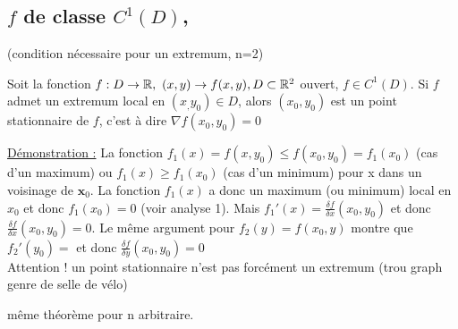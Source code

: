 \documentclass[12pt,a4paper]{article}
\begin{document}
\subsection{$f$ de classe $C^1(D)$,}
(condition nécessaire pour un extremum, n=2)\\
\begin{boite}
	 Soit la fonction $f: D\to \mathbb{R},\ (x,y) \to f(x,y), D\subset \mathbb{R}^2$ ouvert, $f \in C^1(D)$. Si $f$ admet un extremum local en $(x_,y_0) \in D$, alors $(x_0,y_0)$ est un point stationnaire de $f$, c'est à dire $\nabla f(x_0,y_0) = 0$
\end{boite}
\uline{Démonstration :} La fonction $f_1(x) = f(x,y_0) \leq f(x_0,y_0) = f_1(x_0)$ (cas d'un maximum) ou $f_1(x) \geq f_1(x_0)$ (cas d'un minimum) pour x dans un voisinage de $\textbf{x}_0$. La fonction $f_1(x)$ a donc un maximum (ou minimum) local en ${x}_0$ et donc $f_1({x}_0) = 0$ (voir analyse 1). Mais $f_1'(x) = \frac{\delta f}{\delta x}(x_0,y_0)$ et donc $\frac{\delta f}{\delta x}(x_0,y_0) = 0$. Le même argument pour $f_2(y) = f(x_0,y)$ montre que $f_2'(y_0) = $ et donc $\frac{\delta f}{\delta y}(x_0,y_0) = 0$\\

 Attention ! un point stationnaire n'est pas forcément un extremum (trou graph genre de selle de vélo)

 même théorème pour n arbitraire.
\end{document}
